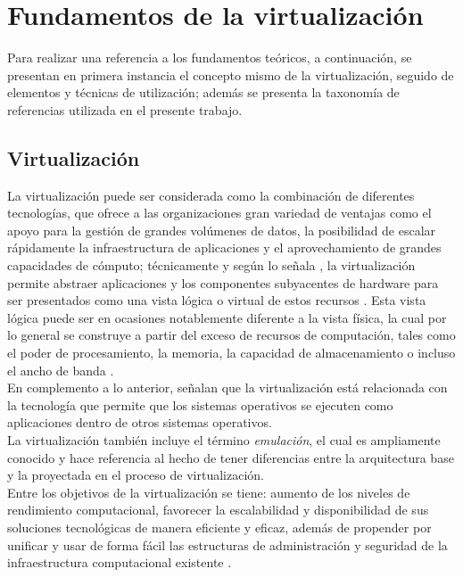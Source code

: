 \section{Fundamentos de la virtualización}\label{fundamentos}

Para realizar una referencia a los fundamentos teóricos, a continuación, se presentan en primera instancia el concepto mismo de la virtualización, seguido de elementos y técnicas de utilización; además se presenta la  taxonomía de referencias utilizada en el presente trabajo. 

\subsection{Virtualización}

La virtualización puede ser considerada como la combinación de diferentes tecnologías, que ofrece a las organizaciones gran variedad de ventajas como el apoyo para la gestión de grandes volúmenes de datos, la posibilidad de escalar rápidamente la infraestructura de aplicaciones y el aprovechamiento de grandes capacidades de cómputo; técnicamente y según lo señala \textcite{Kusnetzky2011}, la virtualización permite abstraer aplicaciones y los componentes subyacentes de hardware para ser presentados como una vista lógica o virtual de estos recursos \parencite{AbdElRahem2016}. Esta vista lógica puede ser en ocasiones notablemente diferente a la vista física, la cual por lo general se construye a partir del exceso de recursos de computación, tales como el poder de  procesamiento, la memoria, la capacidad de almacenamiento o incluso el ancho de banda \parencite{Stallings2015}.\\

En complemento a lo anterior, \textcite{Silberschatz2014} señalan que la virtualización está relacionada con la tecnología que permite que los sistemas operativos se ejecuten como aplicaciones dentro de otros sistemas operativos. \\

La virtualización también incluye el término \textit{emulación}, el cual es ampliamente conocido y hace referencia al hecho de tener diferencias entre la arquitectura base y la proyectada en el proceso de virtualización.\\

Entre los objetivos de la virtualización se tiene: aumento de los niveles de rendimiento computacional, favorecer la escalabilidad y disponibilidad de sus soluciones tecnológicas de manera eficiente y eficaz, además de propender por unificar y usar de forma fácil las estructuras de administración y seguridad de la infraestructura computacional existente \parencite{Kusnetzky2011, Hui2014}. \\

